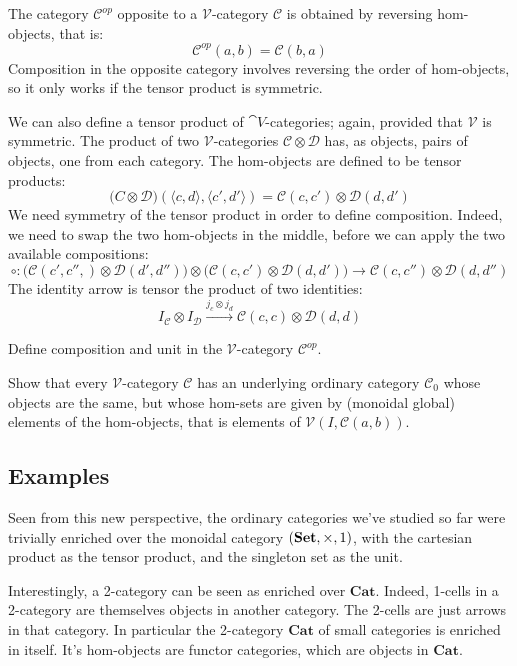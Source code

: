 \documentclass[DaoFP]{subfiles}
\begin{document}
The category $\mathcal C^{op}$ opposite to a $\mathcal V$-category $\mathcal C$ is obtained by reversing hom-objects, that is:
\[ \mathcal C^{op}(a, b) = \mathcal C(b, a) \]
Composition in the opposite category involves reversing the order of hom-objects, so it only works if the tensor product is symmetric.

We can also define a tensor product of $\cat V$-categories; again, provided that $\mathcal V$ is symmetric. The product of two $\mathcal V$-categories $\mathcal C \otimes \mathcal D$ has, as objects, pairs of objects, one from each category. The hom-objects are defined to be tensor products:
\[ \mathcal (C \otimes \mathcal D) (\langle c, d \rangle, \langle c', d' \rangle) = \mathcal C(c, c') \otimes \mathcal D (d, d') \]
We need symmetry of the tensor product in order to define composition. Indeed, we need to swap the two hom-objects in the middle, before we can apply the two available compositions:
\[ \circ \colon  \big(\mathcal C(c', c'',) \otimes \mathcal D (d', d'')\big) \otimes \big( \mathcal C(c, c') \otimes \mathcal D (d, d')\big) \to  \mathcal C(c, c'') \otimes \mathcal D (d, d'') \]
The identity arrow is tensor the product of two identities:
\[ I_{\mathcal C} \otimes I_{\mathcal D} \xrightarrow{j_c \otimes j_d} \mathcal C(c, c) \otimes \mathcal D (d, d) \]


\begin{exercise}
Define composition and unit in the $\mathcal V$-category $\mathcal C^{op}$.
\end{exercise}

\begin{exercise}
Show that every $\mathcal V$-category $\mathcal C$ has an underlying ordinary category $\mathcal C_0$ whose objects are the same, but whose hom-sets are given by (monoidal global) elements of the hom-objects, that is elements of  $\mathcal V(I, \mathcal C(a, b))$.
\end{exercise}

\subsection{Examples}

Seen from this new perspective, the ordinary categories we've studied so far were trivially enriched over the monoidal category $(\mathbf{Set}, \times, 1)$, with the cartesian product as the tensor product, and the singleton set as the unit. 

Interestingly, a 2-category can be seen as enriched over $\mathbf{Cat}$. Indeed, 1-cells in a 2-category are themselves objects in another category. The 2-cells are just arrows in that category. In particular the 2-category $\mathbf{Cat}$ of small categories is enriched in itself. It's hom-objects are functor categories, which are objects in $\mathbf{Cat}$.
\end{document}
